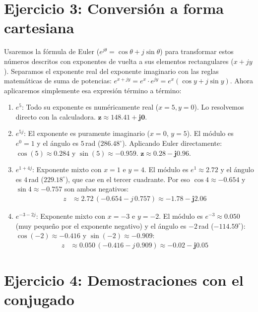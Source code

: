 \documentclass[10pt,a4paper]{article}
\begin{document}
	\section*{Ejercicio 3: Conversión a forma cartesiana}
	
	Usaremos la fórmula de Euler ($e^{j\theta} = \cos \theta + j \sin \theta$) para transformar estos números descritos con exponentes de vuelta a sus elementos rectangulares ($x+jy$). Separamos el exponente real del exponente imaginario con las reglas matemáticas de suma de potencias: $e^{x+jy} = e^x \cdot e^{jy} = e^x(\cos y + j \sin y)$. Ahora aplicaremos simplemente esa expresión término a término:
	
	\begin{enumerate}[label=\textbf{\alph*)}]
		\item \textbf{$e^5$}: Todo su exponente es numéricamente real ($x=5, y=0$). Lo resolvemos directo con la calculadora. \quad $\mathbf{z \approx 148.41 + j0}$.
		\item \textbf{$e^{5j}$}: El exponente es puramente imaginario ($x=0$, $y=5$). El módulo es $e^0 = 1$ y el ángulo es $5$\,rad ($286.48^\circ$). Aplicando Euler directamente: $\cos(5) \approx 0.284$ y $\sin(5) \approx -0.959$. \quad $\mathbf{z \approx 0.28 - j0.96}$.
		\item \textbf{$e^{1+4j}$}: Exponente mixto con $x=1$ e $y=4$. El módulo es $e^1 \approx 2.72$ y el ángulo es $4$\,rad ($229.18^\circ$), que cae en el tercer cuadrante. Por eso $\cos 4 \approx -0.654$ y $\sin 4 \approx -0.757$ son ambos negativos:
		\begin{align*}
			z &\approx 2.72\,(-0.654 - j\,0.757) \approx \mathbf{-1.78 - j2.06}
		\end{align*}
		\item \textbf{$e^{-3-2j}$}: Exponente mixto con $x=-3$ e $y=-2$. El módulo es $e^{-3} \approx 0.050$ (muy pequeño por el exponente negativo) y el ángulo es $-2$\,rad ($-114.59^\circ$): $\cos(-2) \approx -0.416$ y $\sin(-2) \approx -0.909$:
		\begin{align*}
			z &\approx 0.050\,(-0.416 - j\,0.909) \approx \mathbf{-0.02 - j0.05}
		\end{align*}
	\end{enumerate}

\section*{Ejercicio 4: Demostraciones con el conjugado}
\end{document}
